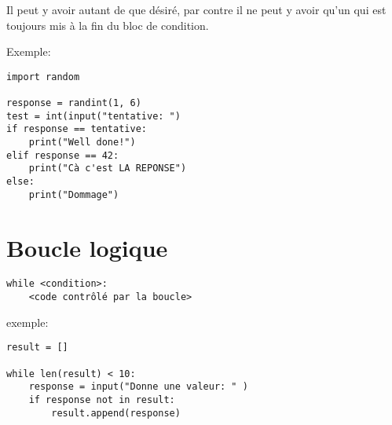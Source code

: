 \documentclass[10pt,a4paper,landscape]{article}
\begin{document}
\begin{multicols}{2}
Il peut y avoir autant de  que d\'esir\'e, par contre il ne peut y avoir qu'un  qui est toujours mis à la fin du bloc de condition.

Exemple:

\begin{lstlisting}
import random

response = randint(1, 6)
test = int(input("tentative: ")
if response == tentative:
	print("Well done!")
elif response == 42:
	print("Cà c'est LA REPONSE")
else:
	print("Dommage")
\end{lstlisting}


\section{Boucle logique}

\begin{lstlisting}
while <condition>:
	<code contrôlé par la boucle>
\end{lstlisting}


{\normalsize exemple:}
\begin{lstlisting}
result = []
 
while len(result) < 10:
	response = input("Donne une valeur: " )
	if response not in result:	
		result.append(response)
\end{lstlisting}

\end{multicols}
\end{document}
